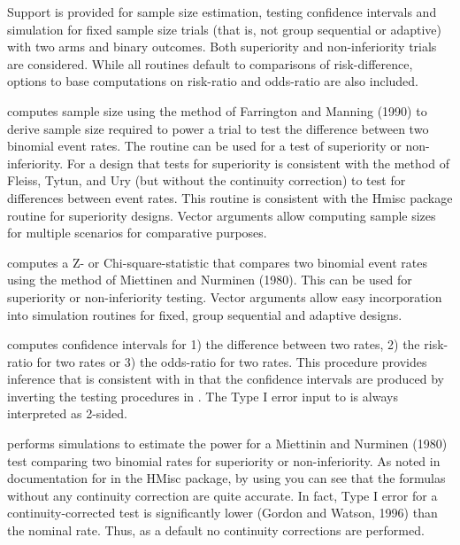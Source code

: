 \begin{Description}\relax
Support is provided for sample size estimation, testing confidence intervals and simulation for fixed sample size trials 
(that is, not group sequential or adaptive) with two arms and binary outcomes. 
Both superiority and non-inferiority trials are considered.
While all routines default to comparisons of risk-difference, 
options to base computations on risk-ratio and odds-ratio are also included. 

 computes sample size using the method of Farrington and 
Manning (1990) to derive sample size required to power a trial to test the difference between two binomial event rates. 
The routine can be used for a test of superiority or non-inferiority.
For a design that tests for superiority  is consistent with the method of Fleiss, Tytun, and Ury (but without the continuity correction) to test for differences between event rates.
This routine is consistent with the Hmisc package routine  for superiority designs.
Vector arguments allow computing sample sizes for multiple scenarios for comparative purposes.

 computes a Z- or Chi-square-statistic that compares two binomial event rates using 
the method of Miettinen and Nurminen (1980). This can be used for superiority or non-inferiority testing.
Vector arguments allow easy incorporation into simulation routines for fixed, group sequential and adaptive designs.

 computes confidence intervals for 1) the difference between two rates, 2) the risk-ratio for two rates 
or 3) the odds-ratio for two rates. This procedure provides inference that is consistent with  in that 
the confidence intervals are produced by inverting the testing procedures in .
The Type I error  input to  is always interpreted as 2-sided.

 performs simulations to estimate the power for a Miettinin and Nurminen (1980) test
comparing two binomial rates for superiority or non-inferiority. 
As noted in documentation for  in the HMisc package, by using  you can see that the formulas without any continuity correction are quite accurate. 
In fact, Type I error for a continuity-corrected test is significantly lower (Gordon and Watson, 1996) than the nominal rate. 
Thus, as a default no continuity corrections are performed.
\end{Description}
